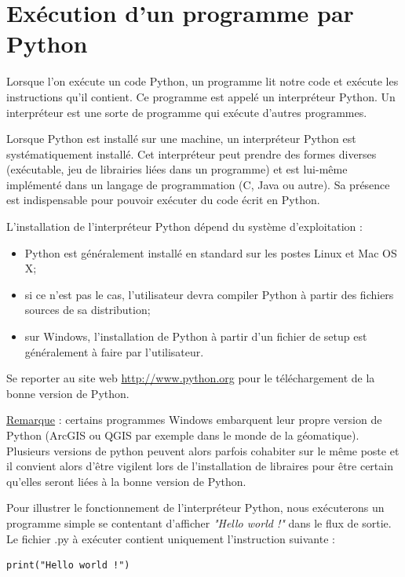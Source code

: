 \documentclass[12pt, a4paper]{article}
\begin{document}
\section{Exécution d'un programme par Python}
\label{sec:execution_programme_python}
Lorsque l'on exécute un code Python, un programme lit notre code et exécute les instructions qu'il contient. Ce programme est appelé un interpréteur Python. Un interpréteur est une sorte de programme qui exécute d'autres programmes.

Lorsque Python est installé sur une machine, un interpréteur Python est systématiquement installé. Cet interpréteur peut prendre des formes diverses (exécutable, jeu de librairies liées dans un programme) et est lui-même implémenté dans un langage de programmation (C, Java ou autre). Sa présence est indispensable pour pouvoir exécuter du code écrit en Python.

L'installation de l'interpréteur Python dépend du système d'exploitation :
\begin{itemize}
	\item Python est généralement installé en standard sur les postes Linux et Mac OS X;
	\item si ce n'est pas le cas, l'utilisateur devra compiler Python à partir des fichiers sources de sa distribution;
	\item sur Windows, l'installation de Python à partir d'un fichier de setup est généralement à faire par l'utilisateur. 
\end{itemize}

Se reporter au site web \url{http://www.python.org} pour le téléchargement de la bonne version de Python.

\underline{Remarque} : certains programmes Windows embarquent leur propre version de Python (ArcGIS ou QGIS par exemple dans le monde de la géomatique). Plusieurs versions de python peuvent alors parfois cohabiter sur le même poste et il convient alors d'être vigilent lors de l'installation de libraires pour être certain qu'elles seront liées à la bonne version de Python.

Pour illustrer le fonctionnement de l'interpréteur Python, nous exécuterons un programme simple se contentant d'afficher \textit{"Hello world !"} dans le flux de sortie. Le fichier .py à exécuter contient uniquement l'instruction suivante :
\begin{lstlisting}
print("Hello world !")
\end{lstlisting}
\end{document}
